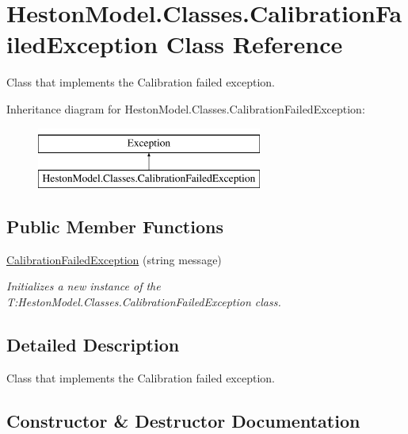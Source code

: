 \hypertarget{class_heston_model_1_1_classes_1_1_calibration_failed_exception}{}\section{Heston\+Model.\+Classes.\+Calibration\+Failed\+Exception Class Reference}
\label{class_heston_model_1_1_classes_1_1_calibration_failed_exception}


Class that implements the Calibration failed exception.  


Inheritance diagram for Heston\+Model.\+Classes.\+Calibration\+Failed\+Exception\+:\begin{figure}[H]
\begin{center}
\leavevmode
\includegraphics[height=2.000000cm]{class_heston_model_1_1_classes_1_1_calibration_failed_exception}
\end{center}
\end{figure}
\subsection*{Public Member Functions}
\begin{DoxyCompactItemize}
\item 
\mbox{\hyperlink{class_heston_model_1_1_classes_1_1_calibration_failed_exception_a742418d6db082ca1cf54f2a898681ae4}{Calibration\+Failed\+Exception}} (string message)
\begin{DoxyCompactList}\small\item\em Initializes a new instance of the T\+:\+Heston\+Model.\+Classes.\+Calibration\+Failed\+Exception class. \end{DoxyCompactList}\end{DoxyCompactItemize}


\subsection{Detailed Description}
Class that implements the Calibration failed exception. 



\subsection{Constructor \& Destructor Documentation}
\mbox{\label{class_heston_model_1_1_classes_1_1_calibration_failed_exception_a742418d6db082ca1cf54f2a898681ae4}} 
